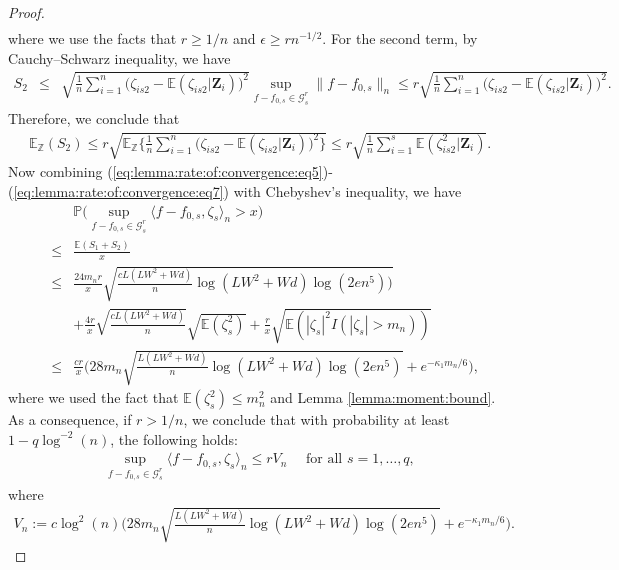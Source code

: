 \documentclass[11pt, preprint]{imsart}
\numberwithin{equation}{section}
\def \mcG{\mathcal{G}}
\def \bfZ{\mathbf{Z}}
\def \ev{\mathbb{E}}
\def \pr{\mathbb{P}}
\theoremstyle{plain}
\theoremstyle{definition}
\begin{document}
\begin{proof}
\begin{eqnarray}
	\label{eq:lemma:rate:of:convergence:eq6}
\end{eqnarray}
where we use the facts that $r\geq 1/n$ and $\epsilon\geq rn^{-1/2}$. For the second term, by Cauchy–Schwarz inequality, we have
\begin{eqnarray}
	S_2&\leq&  \sqrt{\frac{1}{n}\sum_{i=1}^n\bigg(\zeta_{is2}-\ev(\zeta_{is2}|\bfZ_i)\bigg)^2}\sup_{f-f_{0,s}\in \mcG_s^r} \|f-f_{0,s}\|_n\leq r\sqrt{\frac{1}{n}\sum_{i=1}^n\bigg(\zeta_{is2}-\ev(\zeta_{is2}|\bfZ_i)\bigg)^2}.\nonumber
\end{eqnarray}
Therefore, we conclude that
\begin{eqnarray}
	\ev_{\mathbb{Z}}(S_2)\leq r \sqrt{\ev_{\mathbb{Z}}\bigg\{\frac{1}{n}\sum_{i=1}^n\bigg(\zeta_{is2}-\ev(\zeta_{is2}|\bfZ_i)\bigg)^2\bigg\}}\leq r\sqrt{\frac{1}{n}\sum_{i=1}^s\ev(\zeta_{is2}^2|\bfZ_i)}\label{eq:lemma:rate:of:convergence:eq7}.
\end{eqnarray}
Now combining (\ref{eq:lemma:rate:of:convergence:eq5})-(\ref{eq:lemma:rate:of:convergence:eq7}) with Chebyshev's inequality, we have 
\begin{eqnarray}
	&&\pr\bigg(\sup_{f-f_{0,s}\in \mcG_s^r}\langle f-f_{0,s}, \zeta_s\rangle_n>x\bigg)\nonumber\\
	&\leq& \frac{\ev(S_1+S_2)}{x}\nonumber\\
	&\leq& \frac{24m_nr}{x}\sqrt{\frac{cL(LW^2+Wd)}{n}\log(LW^2+Wd)\log(2en^5)\bigg)}\nonumber\\
	&&+\frac{4r}{x}\sqrt{\frac{cL(LW^2+Wd)}{n}}\sqrt{\ev(\zeta_s^2)}+\frac{r}{x}\sqrt{\ev(|\zeta_s|^2I(|\zeta_s|>m_n))}\nonumber\\
&\leq& 	\frac{cr}{x} \bigg(28m_n \sqrt{\frac{L(LW^2+Wd)}{n}\log(LW^2+Wd)\log(2en^5)}+e^{-\kappa_1m_n/6}\bigg),\nonumber
\end{eqnarray}
where we used the fact that $\ev(\zeta_s^2)\leq m_n^2$ and Lemma \ref{lemma:moment:bound}. As a consequence,  if $r>1/n$, we conclude that with probability at least $1-q\log^{-2}(n)$, the following holds:
\begin{eqnarray}
\sup_{f-f_{0, s}\in \mcG_s^r}\langle f-f_{0, s}, \zeta_s\rangle_n\leq rV_n\quad \textrm{ for all } s=1,\ldots, q,
\label{eq:lemma:rate:of:convergence:step2:conclusion}
\end{eqnarray}
where
\begin{eqnarray}
V_n:=c\log^2(n)\bigg(28m_n \sqrt{\frac{L(LW^2+Wd)}{n}\log(LW^2+Wd)\log(2en^5)}+e^{-\kappa_1m_n/6}\bigg)\nonumber.
\end{eqnarray}

\end{proof}
\end{document}
